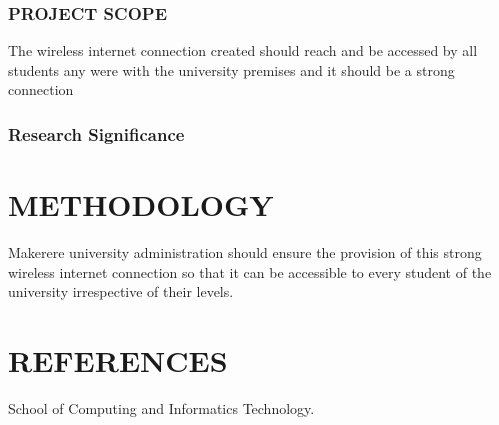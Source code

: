 \documentclass{article}
\begin{document}
\subsubsection{ PROJECT SCOPE}
The wireless internet connection created should reach and be accessed by all students  any were with the university premises and it should be a strong connection
	\subsubsection{ Research Significance}
	
	
 \section{ METHODOLOGY}

 Makerere university administration should ensure the provision of this strong wireless internet connection so that it can be accessible to every student of the university irrespective of their levels.
\section{REFERENCES}
School of Computing and Informatics Technology.

 

  
  
\end{document}
